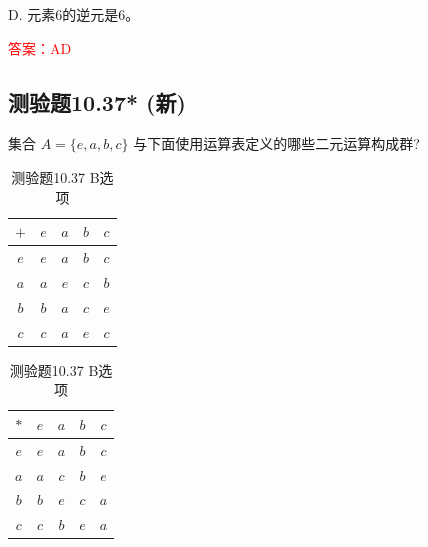 \documentclass[UTF8, heading=true]{ctexart}
\begin{document}
D. 元素6的逆元是6。

\textcolor{red}{答案：AD}

\subsection{测验题10.37* (新)}

集合 $A=\{e, a, b, c\}$  与下面使用运算表定义的哪些二元运算构成群?

\begin{table}[H]
  \centering
  \renewcommand{\arraystretch}{1.3}
  \begin{minipage}{0.45\textwidth}
    \centering
    \begin{tabular}{c|cccc}
      \hline
      $+$ & $e$ & $a$ & $b$ & $c$ \\
      \hline
      $e$ & $e$ & $a$ & $b$ & $c$ \\
      $a$ & $a$ & $e$ & $c$ & $b$ \\
      $b$ & $b$ & $a$ & $c$ & $e$ \\
      $c$ & $c$ & $a$ & $e$ & $c$ \\
      \hline
    \end{tabular}
    \vspace{0.5cm}
    \caption{测验题10.37 A选项}
  \end{minipage}
  \hspace{0.05\textwidth}
  \begin{minipage}{0.45\textwidth}
    \centering
    \begin{tabular}{c|cccc}
      \hline
      $*$ & $e$ & $a$ & $b$ & $c$ \\
      \hline
      $e$ & $e$ & $a$ & $b$ & $c$ \\
      $a$ & $a$ & $c$ & $b$ & $e$ \\
      $b$ & $b$ & $e$ & $c$ & $a$ \\
      $c$ & $c$ & $b$ & $e$ & $a$ \\
      \hline
    \end{tabular}
    \vspace{0.5cm}
    \caption{测验题10.37 B选项}
  \end{minipage}
\end{table}
\end{document}
